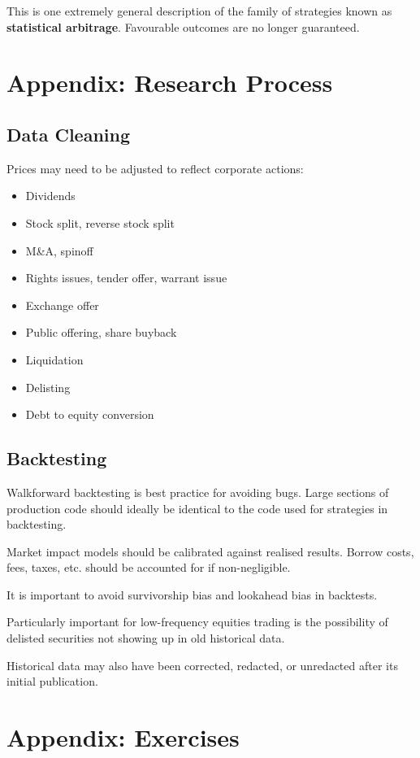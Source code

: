 \documentclass{article}
\begin{document}
This is one extremely general description of the family of strategies known as \textbf{statistical arbitrage}. Favourable outcomes are no longer guaranteed.

\section{Appendix: Research Process}
\subsection{Data Cleaning}
Prices may need to be adjusted to reflect corporate actions:
\begin{itemize}
	\item Dividends
	\item Stock split, reverse stock split
	\item M\&A, spinoff
	\item Rights issues, tender offer, warrant issue
	\item Exchange offer
	\item Public offering, share buyback
	\item Liquidation
	\item Delisting
	\item Debt to equity conversion
\end{itemize}

\subsection{Backtesting}
Walkforward backtesting is best practice for avoiding bugs. Large sections of production code should ideally be identical to the code used for strategies in backtesting.

Market impact models should be calibrated against realised results. Borrow costs, fees, taxes, etc. should be accounted for if non-negligible.

It is important to avoid survivorship bias and lookahead bias in backtests.

Particularly important for low-frequency equities trading is the possibility of delisted securities not showing up in old historical data.

Historical data may also have been corrected, redacted, or unredacted after its initial publication.

\section{Appendix: Exercises}
\end{document}
